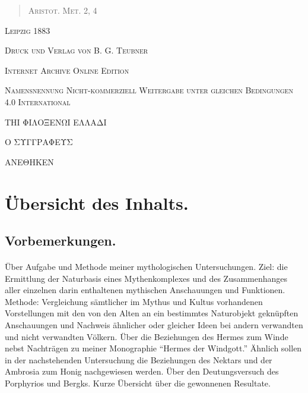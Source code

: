 \documentclass[a4paper, 11pt, oneside]{article}
\begin{document}
\begin{titlepage}
\begin{quotation}
        \scshape Aristot. Met. 2, 4
        \end{quotation}

        \vspace*{\fill}

	\vspace{1\baselineskip}

	{\small\scshape Leipzig 1883}
	
	{\small\scshape{Druck und Verlag von B. G. Teubner}}
 
	\vspace{0.5\baselineskip} %

        \scshape Internet Archive Online Edition  %
	
	{\scshape\small Namensnennung Nicht-kommerziell Weitergabe unter gleichen Bedingungen 4.0 International} %
\end{titlepage}
\setlength{\parskip}{1mm plus1mm minus1mm}
\clearpage
\vspace*{\fill}
\begin{center}
\LARGE
ΤΗΙ ΦΙΛΟΞΕΝΩΙ ΕΛΛΑΔΙ

Ο ΣΥΓΓΡΑΦΕΥΣ

ΑΝΕΘΗΚΕΝ
\end{center}
\vspace*{\fill}
\clearpage
\Large
\tableofcontents
\clearpage
\section*{Übersicht des Inhalts.}
\subsection*{Vorbemerkungen.}
\paragraph{}
Über Aufgabe und Methode meiner mythologischen Untersuchungen. Ziel: die Ermittlung der Naturbasis eines Mythenkomplexes und des Zusammenhanges aller einzelnen darin enthaltenen mythischen Anschauungen und Funktionen. Methode: Vergleichung sämtlicher im Mythus und Kultus vorhandenen Vorstellungen mit den von den Alten an ein bestimmtes Naturobjekt geknüpften Anschauungen und Nachweis ähnlicher oder gleicher Ideen bei andern verwandten und nicht verwandten Völkern. Über die Beziehungen des Hermes zum Winde nebst Nachträgen zu meiner Monographie "`Hermes der Windgott."' Ähnlich sollen in der nachstehenden Untersuchung die Beziehungen des Nektars und der Ambrosia zum Honig nachgewiesen werden. Über den Deutungsversuch des Porphyrios und Bergks. Kurze Übersicht über die gewonnenen Resultate.
\end{document}
